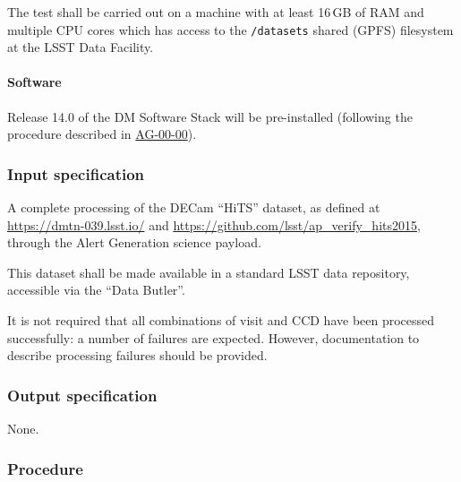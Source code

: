 The test shall be carried out on a machine with at least 16\,GB of RAM and
multiple CPU cores which has access to the \texttt{/datasets} shared (GPFS)
filesystem at the LSST Data Facility.

\paragraph{Software}

Release 14.0 of the DM Software Stack will be pre-installed (following the
procedure described in \hyperref[ag-00-00]{AG-00-00}).

\subsubsection{Input specification}

A complete processing of the DECam ``HiTS'' dataset, as defined at
\url{https://dmtn-039.lsst.io/} and
\url{https://github.com/lsst/ap_verify_hits2015}, through the Alert
Generation science payload.

This dataset shall be made available in a standard LSST data repository,
accessible via the ``Data Butler''.

It is not required that all combinations of visit and CCD have been processed
successfully: a number of failures are expected. However, documentation to
describe processing failures should be provided.

\subsubsection{Output specification}

None.

\subsubsection{Procedure}

